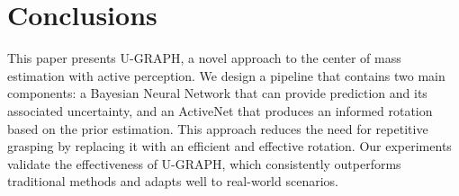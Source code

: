 \section{Conclusions}

This paper presents U-GRAPH, a novel approach to the center of mass estimation with active perception. We design a pipeline that contains two main components: a Bayesian Neural Network that can provide prediction and its associated uncertainty, and an ActiveNet that produces an informed rotation based on the prior estimation. This approach reduces the need for repetitive grasping by replacing it with an efficient and effective rotation. Our experiments validate the effectiveness of U-GRAPH, which consistently outperforms traditional methods and adapts well to real-world scenarios. 